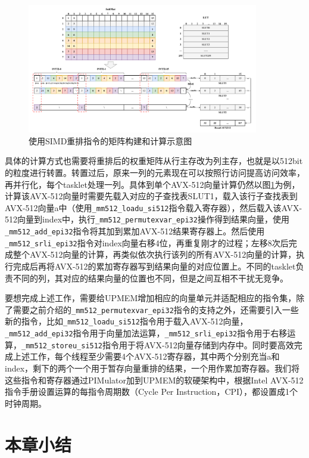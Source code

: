 \begin{figure}[!htbp]
	\centering
    \includegraphics[width=0.9\textwidth]{figures/SIMD.pdf}
	\caption{使用SIMD重排指令的矩阵构建和计算示意图}
    \label{SIMD}
\end{figure}

具体的计算方式也需要将重排后的权重矩阵从行主存改为列主存，也就是以512bit的粒度进行转置。转置过后，原来一列的元素现在可以按照行访问提高访问效率，再并行化，每个tasklet处理一列。具体到单个AVX-512向量计算仍然以图\ref{SIMD}为例，计算该AVX-512向量时需要先载入对应的子查找表SLUT1，载入该行子查找表到AVX-512向量a中（使用\verb|_mm512_loadu_si512|指令载入寄存器），然后载入该AVX-512向量到index中，执行\verb|_mm512_permutexvar_epi32|操作得到结果向量，使用\verb|_mm512_add_epi32|指令将其加到累加AVX-512结果寄存器上。然后使用\verb|_mm512_srli_epi32|指令对index向量右移4位，再重复刚才的过程；左移8次后完成整个AVX-512向量的计算，再类似依次执行该列的所有AVX-512向量的计算，执行完成后再将AVX-512的累加寄存器写到结果向量的对应位置上。不同的tasklet负责不同的列，其对应的结果向量的位置也不同，但是之间互相不干扰无竞争。

要想完成上述工作，需要给UPMEM增加相应的向量单元并适配相应的指令集，除了需要之前介绍的\verb|_mm512_permutexvar_epi32|指令的支持之外，还需要引入一些新的指令，比如\verb|_mm512_loadu_si512|指令用于载入AVX-512向量，\verb|_mm512_add_epi32|指令用于向量加法运算，\verb|_mm512_srli_epi32|指令用于右移运算，\verb|_mm512_storeu_si512|指令用于将AVX-512向量存储到内存中。同时要高效完成上述工作，每个线程至少需要4个AVX-512寄存器，其中两个分别充当a和index，剩下的两个一个用于暂存向量重排的结果，一个用作累加寄存器。我们将这些指令和寄存器通过PIMulator加到UPMEM的软硬架构中，根据Intel AVX-512指令手册设置运算的每指令周期数（Cycle Per Instruction，CPI），都设置成1个时钟周期。

\section{本章小结}